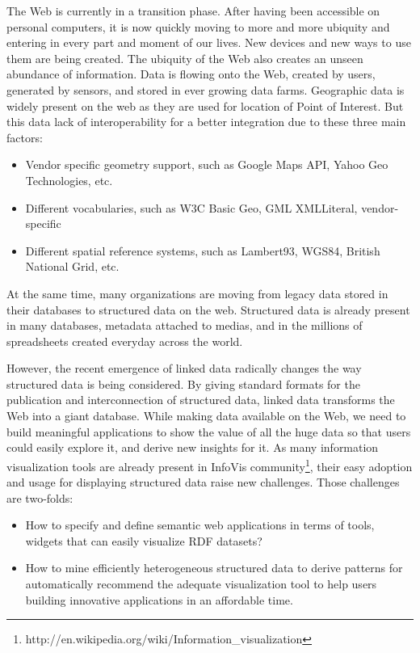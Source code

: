 The Web is currently in a transition phase. After having been accessible on personal computers, it is now 
quickly moving to more and more ubiquity and entering in every part and moment of our lives. New 
devices and new ways to use them are being created. The ubiquity of the Web also creates an unseen 
abundance of information. Data is flowing onto the Web, created by users, generated by sensors, and 
stored in ever growing data farms. Geographic data is widely present on the web as they are used for location 
of Point of Interest. But this data lack of interoperability for a better integration due to these three main factors:
\begin{itemize}
\item Vendor specific geometry support, such as Google Maps API, Yahoo Geo Technologies, etc.
\item Different vocabularies, such as W3C Basic Geo, GML XMLLiteral, vendor-specific
\item Different spatial reference systems, such as Lambert93, WGS84, British National Grid, etc.
\end{itemize}
At the same time, many organizations are moving from legacy data stored in their databases
to structured data on the web. Structured data is already present in many databases, metadata attached to medias, and in the millions of spreadsheets created everyday across the world. 

However, the recent emergence of linked data radically changes the way structured data is being considered. By giving standard formats for the publication and interconnection of structured data, linked data transforms the Web into a giant database. While making data available on the Web, we need to build meaningful applications to show the value of all the huge data so that users could easily explore it, and derive new insights for it. As many information visualization tools are already present in InfoVis community\footnote{http://en.wikipedia.org/wiki/Information\_visualization}, their easy adoption and usage for displaying structured data raise new challenges. Those challenges are two-folds:
\begin{itemize}
\item How to specify and define semantic web applications in terms of tools, widgets that can easily visualize RDF datasets?
\item How to mine efficiently heterogeneous structured data to derive patterns for automatically recommend the adequate visualization tool to help users building innovative applications in an affordable time.
\end{itemize}

